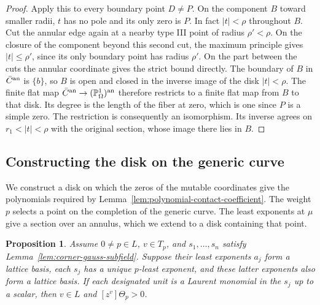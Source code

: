 \documentclass[11pt,reqno]{amsart}
\numberwithin{equation}{section}
\newtheorem{proposition}[theorem]{Proposition}
\theoremstyle{definition}
\theoremstyle{remark}
\begin{document}
\begin{proof}
Apply this to every boundary point \(D\ne P\). On the component \(B\)
toward smaller radii, \(t\) has no pole and its only zero is \(P\).
In fact \(|t|<\rho\) throughout \(B\). Cut the annular edge again
at a nearby type III point of radius \(\rho'<\rho\). On the closure
of the component beyond this second cut, the maximum principle gives
\(|t|\le\rho'\), since its only boundary point has radius \(\rho'\).
On the part between the cuts the annular coordinate gives the strict
bound directly. The boundary of \(B\) in \(\bar C^{\rm an}\) is
\(\{b\}\), so \(B\) is open and closed in the inverse image of the
disk \(|t|<\rho\). The finite flat map
\(\bar C^{\rm an}\to(\mathbb P^1_\Omega)^{\rm an}\) therefore
restricts to a finite flat map from \(B\) to that disk. Its degree
is the length of the fiber at zero, which is one since \(P\) is a
simple zero. The restriction is consequently an isomorphism. Its
inverse agrees on \(r_1<|t|<\rho\) with the original section, whose
image there lies in \(B\).
\end{proof}

\subsection{Constructing the disk on the generic curve}

We construct a disk on which the zeros of the mutable coordinates give
the polynomials required by Lemma~\ref{lem:polynomial-contact-coefficient}.
The weight \(p\) selects a point on the completion of the generic curve.
The least exponents at \(\mu\) give a section over an annulus, which
we extend to a disk containing that point.

\begin{proposition}\label{prop:corner-disk}
Assume \(0\ne p\in L\), \(v\in T_p\), and \(s_1,\ldots,s_n\) satisfy
Lemma~\ref{lem:corner-gauss-subfield}. Suppose their least exponents
\(a_j\) form a lattice basis, each \(s_j\) has a unique \(p\)-least
exponent, and these latter exponents also form a lattice basis.
If each designated unit is a Laurent monomial in the \(s_j\) up to
a scalar, then \(v\in L\) and \([z^v]\Theta_p>0\).
\end{proposition}
\end{document}
